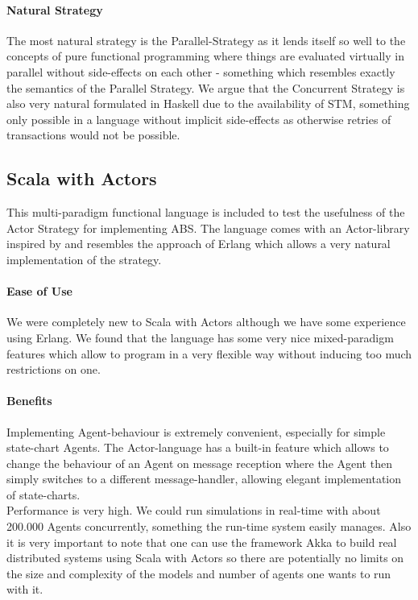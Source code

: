 \paragraph{Natural Strategy}
The most natural strategy is the Parallel-Strategy as it lends itself so well to the concepts of pure functional programming where things are evaluated virtually in parallel without side-effects on each other - something which resembles exactly the semantics of the Parallel Strategy. We argue that the Concurrent Strategy is also very natural formulated in Haskell due to the availability of STM, something only possible in a language without implicit side-effects as otherwise retries of transactions would not be possible.



\subsection{Scala with Actors}
This multi-paradigm functional language is included to test the usefulness of the Actor Strategy for implementing ABS. The language comes with an Actor-library inspired by \cite{agha_actors:_1986} and resembles the approach of Erlang which allows a very natural implementation of the strategy.

\paragraph{Ease of Use}
We were completely new to Scala with Actors although we have some experience using Erlang. We found that the language has some very nice mixed-paradigm features which allow to program in a very flexible way without inducing too much restrictions on one.

\paragraph{Benefits}
Implementing Agent-behaviour is extremely convenient, especially for simple state-chart Agents. The Actor-language has a built-in feature which allows to change the behaviour of an Agent on message reception where the Agent then simply switches to a different message-handler, allowing elegant implementation of state-charts. \\

Performance is very high. We could run simulations in real-time with about 200.000 Agents concurrently, something the run-time system easily manages. Also it is very important to note that one can use the framework Akka to build real distributed systems using Scala with Actors so there are potentially no limits on the size and complexity of the models and number of agents one wants to run with it.

